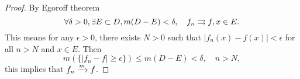 \begin{proof}
  By Egoroff theorem
  \begin{equation}
    \forall \delta > 0, \exists E \subset D, m(D - E) < \delta,
    \quad f_n \rightrightarrows f, x \in E.
  \end{equation}
  This means for any $\epsilon > 0$,
  there exists $N > 0$ such that $|f_n(x) - f(x)| < \epsilon$ for all $n > N$ and $x \in E$.
  Then
  \begin{equation}
    m(\{|f_n - f| \geq \epsilon\}) \leq m(D - E) < \delta, \quad n > N,
  \end{equation}
  this implies that $f_n \xrightarrow{m} f$.
\end{proof}








